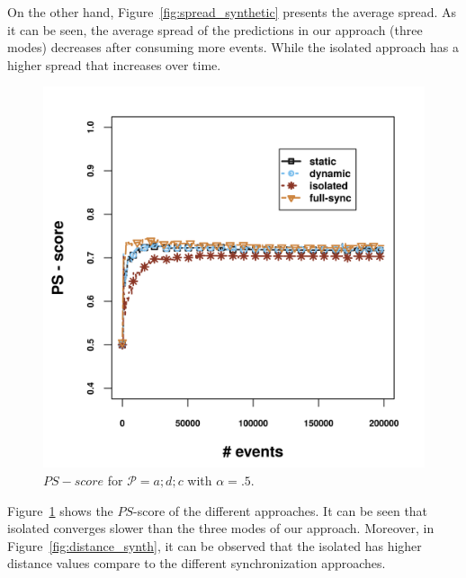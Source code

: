 \par On the other hand, Figure~\ref{fig:spread_synthetic} presents the average spread. As it can be seen, the average spread of the predictions in our approach (three modes) decreases after consuming more events. While the isolated approach has a higher spread that increases over time. 
\begin{figure}[H]
	\centering
	\includegraphics[width=\textwidth]{chapters/figures/synthetic/new/ps_score_synthetic.png}
	
	\caption{$\mathit{PS-score}$ for $\mathcal{P}=a;d;c$ with $\alpha = .5$.}
	\label{fig:ps_score_synth}
\end{figure}

\par Figure~\ref{fig:ps_score_synth} shows the $\mathit{PS}$-score of the different approaches. It can be seen that isolated converges slower than the three modes of our approach. Moreover, in Figure~\ref{fig:distance_synth}, it can be observed that the isolated has higher distance values compare to the different synchronization approaches. 

